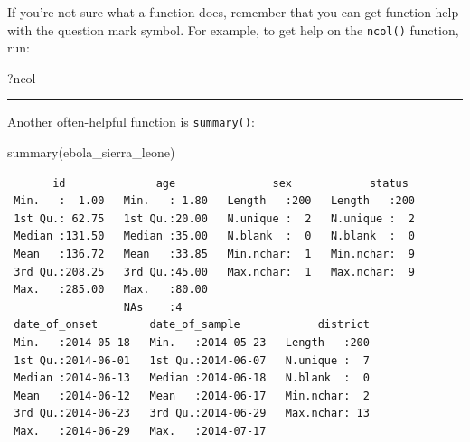 \documentclass[
  letterpaper,
  DIV=11,
  numbers=noendperiod]{scrreprt}
\newenvironment{Shaded}{\begin{snugshade}}{\end{snugshade}}
\newcommand{\FunctionTok}[1]{\textcolor[rgb]{0.28,0.35,0.67}{#1}}
\newcommand{\NormalTok}[1]{\textcolor[rgb]{0.00,0.23,0.31}{#1}}
\begin{document}
\begin{tcolorbox}[enhanced jigsaw, title=\textcolor{quarto-callout-note-color}{\faInfo}\hspace{0.5em}{Reminder}, colbacktitle=quarto-callout-note-color!10!white, leftrule=.75mm, arc=.35mm, opacityback=0, bottomrule=.15mm, rightrule=.15mm, toptitle=1mm, breakable, toprule=.15mm, colback=white, coltitle=black, colframe=quarto-callout-note-color-frame, bottomtitle=1mm, titlerule=0mm, left=2mm, opacitybacktitle=0.6]

If you're not sure what a function does, remember that you can get
function help with the question mark symbol. For example, to get help on
the \texttt{ncol()} function, run:

\begin{Shaded}
\begin{Highlighting}[]
\NormalTok{?ncol}
\end{Highlighting}
\end{Shaded}

\end{tcolorbox}

\begin{center}\rule{0.5\linewidth}{0.5pt}\end{center}

Another often-helpful function is \texttt{summary()}:

\begin{Shaded}
\begin{Highlighting}[]
\FunctionTok{summary}\NormalTok{(ebola\_sierra\_leone)}
\end{Highlighting}
\end{Shaded}

\begin{verbatim}
       id              age               sex            status   
 Min.   :  1.00   Min.   : 1.80   Length   :200   Length   :200  
 1st Qu.: 62.75   1st Qu.:20.00   N.unique :  2   N.unique :  2  
 Median :131.50   Median :35.00   N.blank  :  0   N.blank  :  0  
 Mean   :136.72   Mean   :33.85   Min.nchar:  1   Min.nchar:  9  
 3rd Qu.:208.25   3rd Qu.:45.00   Max.nchar:  1   Max.nchar:  9  
 Max.   :285.00   Max.   :80.00                                  
                  NAs    :4                                      
 date_of_onset        date_of_sample            district  
 Min.   :2014-05-18   Min.   :2014-05-23   Length   :200  
 1st Qu.:2014-06-01   1st Qu.:2014-06-07   N.unique :  7  
 Median :2014-06-13   Median :2014-06-18   N.blank  :  0  
 Mean   :2014-06-12   Mean   :2014-06-17   Min.nchar:  2  
 3rd Qu.:2014-06-23   3rd Qu.:2014-06-29   Max.nchar: 13  
 Max.   :2014-06-29   Max.   :2014-07-17                  
                                                          
\end{verbatim}
\end{document}
